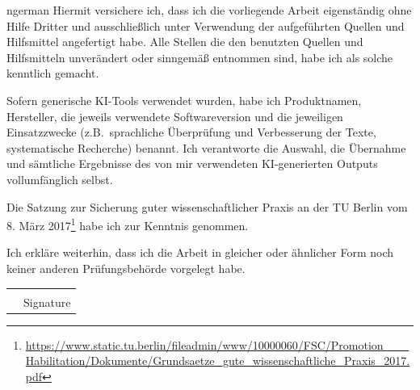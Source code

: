 \vspace*{\fill}
{
    \renewcommand*{\thefootnote}{\fnsymbol{footnote}}
    \noindent
    \begin{otherlanguage}
        {ngerman}
        Hiermit versichere ich, dass ich die vorliegende Arbeit eigenständig ohne Hilfe Dritter und ausschließlich unter Verwendung der aufgeführten Quellen und Hilfsmittel angefertigt habe.
        Alle Stellen die den benutzten Quellen und Hilfsmitteln unverändert oder sinngemäß entnommen sind, habe ich als solche kenntlich gemacht.

        Sofern generische KI-Tools verwendet wurden, habe ich Produktnamen, Hersteller, die jeweils verwendete Softwareversion und die jeweiligen Einsatzzwecke (z.B.~sprachliche Überprüfung und Verbesserung der Texte, systematische Recherche) benannt.
        Ich verantworte die Auswahl, die Übernahme und sämtliche Ergebnisse des von mir verwendeten KI-generierten Outputs vollumfänglich selbst.

        Die Satzung zur Sicherung guter wissenschaftlicher Praxis an der TU Berlin vom 8. März 2017\footnote{\url{https://www.static.tu.berlin/fileadmin/www/10000060/FSC/Promotion___Habilitation/Dokumente/Grundsaetze_gute_wissenschaftliche_Praxis_2017.pdf}} habe ich zur Kenntnis genommen.

        Ich erkläre weiterhin, dass ich die Arbeit in gleicher oder ähnlicher Form noch keiner anderen Prüfungsbehörde
        vorgelegt habe.
    \end{otherlanguage}
    \renewcommand*{\thefootnote}{\arabic{footnote}}
    \setcounter{footnote}{0}
}
\vskip 2cm
\begin{tabular}{@{}p{.5in}p{4in}@{}}
     & \hrulefill \\
     & Signature  \\
\end{tabular}

\vspace*{\fill}
\thispagestyle{empty}
\clearpage